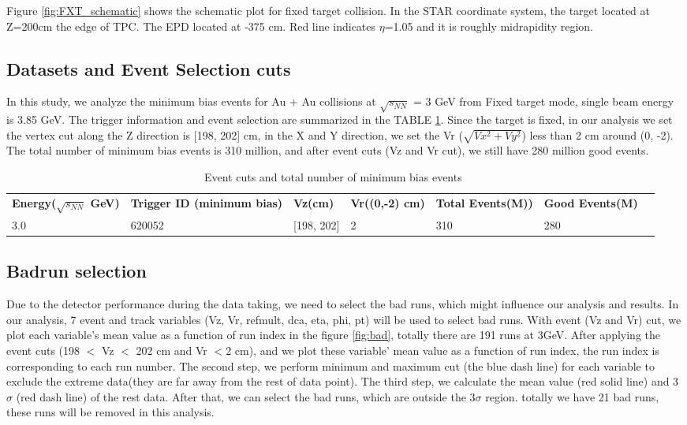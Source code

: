 Figure \ref{fig:FXT_schematic} shows the schematic plot for fixed target collision. In the STAR coordinate system, the target located at Z=200cm the edge of TPC. The EPD located at -375 cm. Red line indicates $\eta$=1.05 and it is roughly midrapidity region.


\subsection{Datasets and Event Selection cuts}
In this study, we analyze the minimum bias events for Au + Au collisions at $\sqrt{s_{NN}}$ = 3 GeV from Fixed target mode, single beam energy is 3.85 GeV. The trigger information and event selection are summarized in the  TABLE \ref{table1}. Since the target is fixed, in our analysis we set the vertex cut along the Z direction is [198, 202] cm, in the X and Y direction, we set the Vr ($\sqrt{Vx^{2}+Vy^{2}}$) less than 2 cm around (0, -2). The total number of minimum bias events is 310 million, and after event cuts (Vz and Vr cut), we still have 280 million good events.

\begin{table}[h]
\centering
\caption{\ Event cuts and total number of minimum bias events}
\label{table1}
\begin{tabular}{l l l l l l l}
	\hline
\small{\textbf{Energy($\sqrt{s_{NN}}$ GeV)}} & \small{\textbf{Trigger ID (minimum bias)}} & \textbf{Vz(cm)} & \textbf{Vr((0,-2) cm)} & \textbf{Total Events(M))} & \textbf{Good Events(M)}\\
3.0 & 620052 & [198, 202] &2 & 310 & 280 \\
	\hline
\end{tabular}
\end{table}
 
\subsection{Badrun selection}
Due to the detector performance during the data taking, we need to select the bad runs, which might influence our analysis and results. In our analysis, 7 event and track variables (Vz, Vr, refmult, dca, eta, phi, pt) will be used to select bad runs. With event (Vz and Vr) cut,  we plot each variable's mean value as a function of run index in the figure \ref{fig:bad}, totally there are 191 runs at 3GeV. After applying the event cuts (198 $<$ Vz $<$ 202 cm and Vr $<$2 cm), and we plot these variable' mean value as a function of run index, the run index is corresponding to each run number. The second step, we perform minimum and maximum cut (the blue dash line) for each variable to exclude the extreme data(they are far away from the rest of data point). The third step, we calculate the mean value (red solid line) and 3$\sigma$ (red dash line) of the rest data. After that, we can select the bad runs, which are outside the 3$\sigma$ region. totally we have 21 bad runs, these runs will be removed in this analysis.
	

